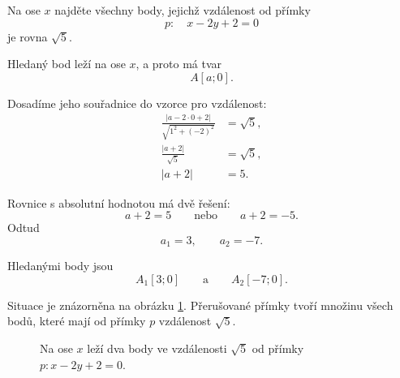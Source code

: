 \begin{example}\label{exa:Point_on_x_axis_given_distance}
    Na ose $x$ najděte všechny body, jejichž vzdálenost od přímky
    \[
        p:\quad x-2y+2=0
    \]
    je rovna $\sqrt5$.

    Hledaný bod leží na ose $x$, a proto má tvar
    \[
        A[a;0].
    \]

    Dosadíme jeho souřadnice do vzorce pro vzdálenost:
    \begin{align*}
        \frac{|a-2\cdot0+2|}{\sqrt{1^2+(-2)^2}}
        &=
        \sqrt5,\\
        \frac{|a+2|}{\sqrt5}
        &=
        \sqrt5,\\
        |a+2|&=5.
    \end{align*}

    Rovnice s absolutní hodnotou má dvě řešení:
    \[
        a+2=5
        \qquad\text{nebo}\qquad
        a+2=-5.
    \]
    Odtud
    \[
        a_1=3,
        \qquad
        a_2=-7.
    \]

    Hledanými body jsou
    \[
        A_1[3;0]
        \qquad\text{a}\qquad
        A_2[-7;0].
    \]

    Situace je znázorněna na obrázku
    \ref{fig:Points_on_x_axis_given_distance}. Přerušované přímky
    tvoří množinu všech bodů, které mají od přímky $p$ vzdálenost
    $\sqrt5$.

    \begin{figure}[H]
        \centering
        \caption{Na ose $x$ leží dva body ve vzdálenosti $\sqrt5$
        od přímky $p:x-2y+2=0$.}
        \label{fig:Points_on_x_axis_given_distance}
    \end{figure}
\end{example}

